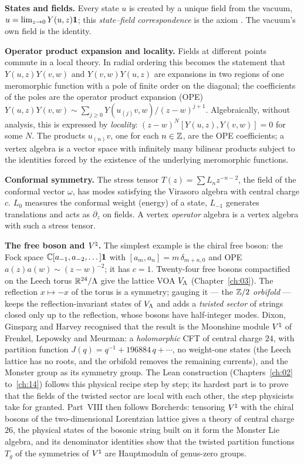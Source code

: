 \textbf{States and fields.} Every state $u$ is created by a unique field from the vacuum,
$u = \lim_{z\to0}Y(u,z)\mathbf{1}$; this \emph{state--field correspondence} is the axiom
. The vacuum's own field is the identity.

\textbf{Operator product expansion and locality.} Fields at different points commute in a local
theory. In radial ordering this becomes the statement that $Y(u,z)Y(v,w)$ and $Y(v,w)Y(u,z)$ are
expansions in two regions of one meromorphic function with a pole of finite order on the diagonal;
the coefficients of the poles are the operator product expansion (OPE)
$Y(u,z)Y(v,w)\sim\sum_{j\ge0}Y(u_{(j)}v,w)/(z-w)^{j+1}$. Algebraically, without analysis, this is
expressed by \emph{locality}: $(z-w)^N[Y(u,z),Y(v,w)] = 0$ for some $N$. The products $u_{(n)}v$,
one for each $n\in{\mathbb{Z}}$, are the OPE coefficients; a vertex algebra is a vector space with infinitely
many bilinear products subject to the identities forced by the existence of the underlying
meromorphic functions.

\textbf{Conformal symmetry.} The stress tensor $T(z) = \sum L_nz^{-n-2}$, the field of the conformal
vector $\omega$, has modes satisfying the Virasoro algebra with central charge $c$. $L_0$ measures
the conformal weight (energy) of a state, $L_{-1}$ generates translations and acts as $\partial_z$ on
fields. A vertex \emph{operator} algebra is a vertex algebra with such a stress tensor.

\textbf{The free boson and ${V^{\natural}}$.} The simplest example is the chiral free boson: the Fock space
${\mathbb{C}}[a_{-1},a_{-2},\dots]\mathbf{1}$ with $[a_m,a_n] = m\,\delta_{m+n,0}$ and OPE
$a(z)a(w)\sim(z-w)^{-2}$; it has $c=1$. Twenty-four free bosons compactified on the Leech torus
$\mathbb R^{24}/{\Lambda}$ give the lattice VOA $V_{\Lambda}$ (Chapter~\ref{ch:03}). The reflection
$x\mapsto -x$ of the torus is a symmetry; gauging it --- the ${\mathbb{Z}}/2$ \emph{orbifold} --- keeps the
reflection-invariant states of $V_{\Lambda}$ and adds a \emph{twisted sector} of strings closed only up
to the reflection, whose bosons have half-integer modes. Dixon, Ginsparg and Harvey recognised that
the result is the Moonshine module ${V^{\natural}}$ of Frenkel, Lepowsky and Meurman: a \emph{holomorphic}
CFT of central charge $24$, with partition function $J(q) = q^{-1} + 196884\,q + \cdots$, no
weight-one states (the Leech lattice has no roots, and the orbifold removes the remaining currents),
and the Monster group as its symmetry group. The Lean construction (Chapters~\ref{ch:02}
to~\ref{ch:14}) follows this physical recipe step by step; its hardest part is to prove that the
fields of the twisted sector are local with each other, the step physicists take for granted.
Part~VIII then follows Borcherds: tensoring ${V^{\natural}}$ with the chiral bosons of the two-dimensional Lorentzian lattice
gives a theory of central charge $26$, the physical states of the bosonic string built on it form the Monster Lie
algebra, and its denominator identities show that the twisted partition functions $T_g$ of the symmetries of ${V^{\natural}}$
are Hauptmoduln of genus-zero groups.

